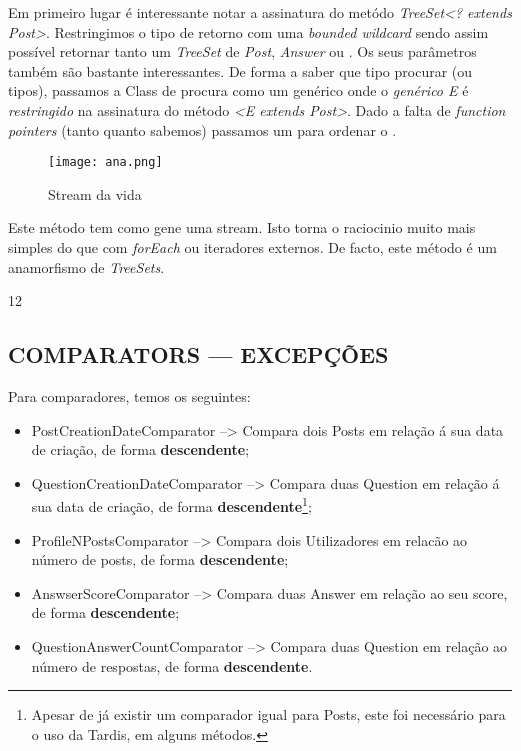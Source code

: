 \documentclass[letterpaper, 10 pt, conference]{IEEEtran} %
\begin{document}
Em primeiro lugar é interessante notar a assinatura do metódo \textit{TreeSet<? extends Post>}. Restringimos o tipo de retorno com uma \textit{bounded wildcard} sendo assim possível retornar tanto um \textit{TreeSet} de \textit{Post}, \textit{Answer} ou .
Os seus parâmetros também são bastante interessantes. De forma a saber que tipo procurar (ou tipos), passamos a Class de procura como um genérico  onde o \textit{genérico E} é \textit{restringido} na assinatura do método \textit{<E extends Post>}.
Dado a falta de \textit{function pointers} (tanto quanto sabemos) passamos um  para ordenar o .

\begin{figure}[h!]
  \centering
  \texttt{[image: ana.png]}
   \caption{Stream da vida}
\end{figure}


Este método tem como gene uma stream. Isto torna o raciocinio muito mais simples do que com \textit{forEach} ou iteradores externos.
De facto, este método é um anamorfismo de \textit{TreeSets}.

12


\subsection{COMPARATORS --- EXCEPÇÕES}

Para comparadores, temos os seguintes:
\begin{itemize}
    \item PostCreationDateComparator --> Compara dois Posts em relação á sua data de criação, de forma \textbf{descendente};
    \item QuestionCreationDateComparator --> Compara duas Question em relação á sua data de criação, de forma \textbf{descendente}\footnote{Apesar de já existir um comparador igual para Posts, este foi necessário para o uso da Tardis, em alguns métodos.};
    \item ProfileNPostsComparator --> Compara dois Utilizadores em relacão ao número de posts, de forma \textbf{descendente};
    \item AnswserScoreComparator --> Compara duas Answer em relação ao seu score, de forma \textbf{descendente};
    \item QuestionAnswerCountComparator --> Compara duas Question em relação ao número de respostas, de forma \textbf{descendente}.
\end{itemize}
\end{document}
